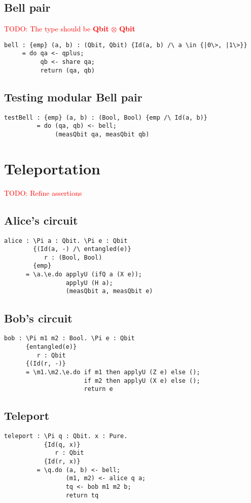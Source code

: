 \documentclass[acmsmall,nonacm,timestamp,review=false,anonymous=false]{acmart}
\newcommand{\type}[1]{\textrm{\textbf{#1}}}
\newcommand{\todo}[1]{\textcolor{red}{#1}}
\begin{document}
\subsection{Bell pair}
\todo{TODO: The type should be \type{Qbit} $\otimes$ \type{Qbit}}
\begin{lstlisting}[language=QHaskell]
bell : {emp} (a, b) : (Qbit, Qbit) {Id(a, b) /\ a \in {|0\>, |1\>}}
     = do qa <- qplus;
          qb <- share qa;
          return (qa, qb)
\end{lstlisting}

\subsection{Testing modular Bell pair}
\begin{lstlisting}[language=QHaskell]
testBell : {emp} (a, b) : (Bool, Bool) {emp /\ Id(a, b)}
         = do (qa, qb) <- bell;
              (measQbit qa, measQbit qb)
\end{lstlisting}

\section{Teleportation}
\label{app:teleport}
\todo{TODO: Refine assertions}
\subsection{Alice's circuit}
\begin{lstlisting}[language=QHaskell]
alice : \Pi a : Qbit. \Pi e : Qbit
        {(Id(a, -) /\ entangled(e)}
           r : (Bool, Bool)
        {emp}
      = \a.\e.do applyU (ifQ a (X e));
                 applyU (H a);
                 (measQbit a, measQbit e)
\end{lstlisting}

\subsection{Bob's circuit}
\begin{lstlisting}[language=QHaskell]
bob : \Pi m1 m2 : Bool. \Pi e : Qbit
      {entangled(e)}
         r : Qbit
      {(Id(r, -)}
      = \m1.\m2.\e.do if m1 then applyU (Z e) else ();
                      if m2 then applyU (X e) else ();
                      return e
\end{lstlisting}

\subsection{Teleport}
\begin{lstlisting}[language=QHaskell]
teleport : \Pi q : Qbit. x : Pure.
           {Id(q, x)}
              r : Qbit
           {Id(r, x)}
         = \q.do (a, b) <- bell;
                 (m1, m2) <- alice q a;
                 tq <- bob m1 m2 b;
                 return tq
\end{lstlisting}

\end{document}
